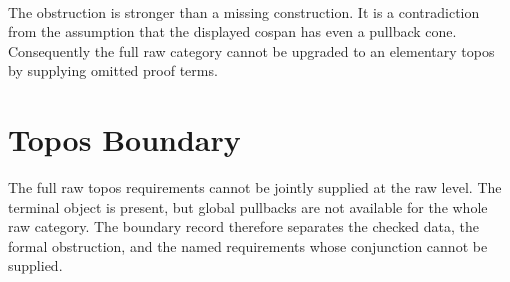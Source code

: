 \documentclass[11pt]{article}
\begin{document}
\begin{code}
\AgdaSymbol{(}\AgdaSpace{}%
\AgdaSymbol{)))}\<%
\\
%
\>[10]\AgdaSymbol{(}\AgdaSpace{}%
\AgdaSymbol{)))}\<%
\\
%
\>[6]\AgdaSymbol{(}\<%
\\
\>[6][@{}l@{\AgdaIndent{0}}]%
\>[8]\AgdaSymbol{(}\AgdaSpace{}%
\AgdaSymbol{(}\AgdaSpace{}%
\AgdaSymbol{)}\AgdaSpace{}%
\AgdaSymbol{(}\AgdaSpace{}%
\AgdaSymbol{(}\AgdaSpace{}%
\AgdaSymbol{)))}\<%
\\
%
\>[8]\AgdaSymbol{(}\<%
\\
\>[8][@{}l@{\AgdaIndent{0}}]%
\>[10]\AgdaSymbol{(}\AgdaSpace{}%
\AgdaSymbol{(}\AgdaSpace{}%
\AgdaSymbol{)}\AgdaSpace{}%
\AgdaSymbol{(}\AgdaSpace{}%
\AgdaSymbol{(}\AgdaSpace{}%
\AgdaSymbol{)))}\<%
\\
%
\>[10]\AgdaSymbol{(}\AgdaSpace{}%
\AgdaSymbol{))))}\<%
\end{code}

The obstruction is stronger than a missing construction.  It is a
contradiction from the assumption that the displayed cospan has even a
pullback cone.  Consequently the full raw category cannot be upgraded to
an elementary topos by supplying omitted proof terms.

\section{Topos Boundary}

The full raw topos requirements cannot be jointly supplied at the raw
level.  The terminal object is present, but global pullbacks are not
available for the whole raw category.  The boundary record therefore
separates the checked data, the formal obstruction, and the named
requirements whose conjunction cannot be supplied.
\end{document}
